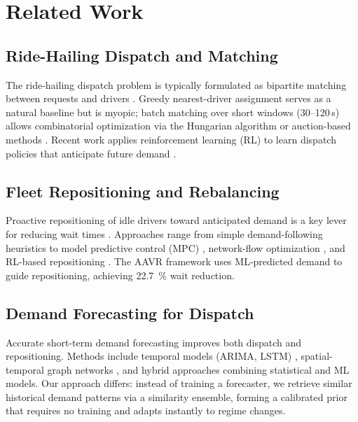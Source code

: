 \documentclass[conference,10pt]{IEEEtran}
\begin{document}
\section{Related Work}
\label{sec:related}

\subsection{Ride-Hailing Dispatch and Matching}

The ride-hailing dispatch problem is typically formulated as bipartite
matching between requests and drivers
\cite{lowalekar2018online,bei2018algorithms,alonsoMora2017ondemand}. Greedy nearest-driver
assignment serves as a natural baseline but is myopic; batch matching
over short windows (30--120\,s) allows combinatorial optimization via the
Hungarian algorithm or auction-based methods
\cite{kuhn1955hungarian,bertsekas1981new}. Recent work applies
reinforcement learning (RL) to learn dispatch policies that anticipate
future demand \cite{tang2019deep,wen2017rebalancing}.

\subsection{Fleet Repositioning and Rebalancing}

Proactive repositioning of idle drivers toward anticipated demand is a key
lever for reducing wait times \cite{wen2017rebalancing}. Approaches range
from simple demand-following heuristics to model predictive control (MPC)
\cite{iglesias2018data}, network-flow optimization
\cite{wallar2018vehicle}, and RL-based repositioning
\cite{lin2018efficient,namdarpour2025sim}. The AAVR framework
\cite{guo2024aavr} uses ML-predicted demand to guide repositioning,
achieving \SI{22.7}{\percent} wait reduction.

\subsection{Demand Forecasting for Dispatch}

Accurate short-term demand forecasting improves both dispatch and
repositioning. Methods include temporal models (ARIMA, LSTM)
\cite{yao2018deep}, spatial-temporal graph networks
\cite{li2018diffusion}, and hybrid approaches combining statistical
and ML models. Our approach differs: instead of training a forecaster,
we retrieve similar historical demand patterns via a similarity ensemble,
forming a calibrated prior that requires no training and adapts
instantly to regime changes.
\end{document}
